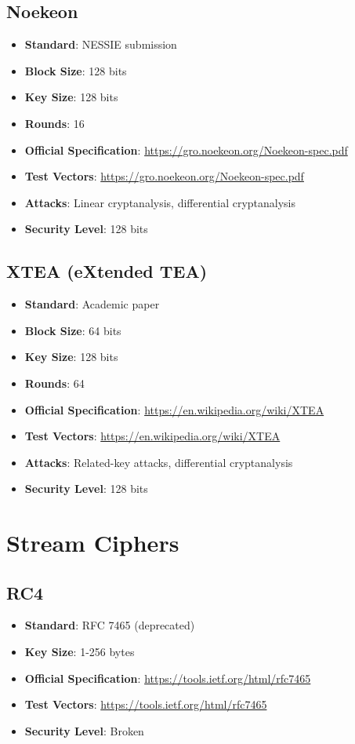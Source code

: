 \documentclass[11pt,a4paper]{article}
\begin{document}
\subsection{Noekeon}
\begin{itemize}
    \item \textbf{Standard}: NESSIE submission
    \item \textbf{Block Size}: 128 bits
    \item \textbf{Key Size}: 128 bits
    \item \textbf{Rounds}: 16
    \item \textbf{Official Specification}: \url{https://gro.noekeon.org/Noekeon-spec.pdf}
    \item \textbf{Test Vectors}: \url{https://gro.noekeon.org/Noekeon-spec.pdf}
    \item \textbf{Attacks}: Linear cryptanalysis, differential cryptanalysis
    \item \textbf{Security Level}: 128 bits
\end{itemize}

\subsection{XTEA (eXtended TEA)}
\begin{itemize}
    \item \textbf{Standard}: Academic paper
    \item \textbf{Block Size}: 64 bits
    \item \textbf{Key Size}: 128 bits
    \item \textbf{Rounds}: 64
    \item \textbf{Official Specification}: \url{https://en.wikipedia.org/wiki/XTEA}
    \item \textbf{Test Vectors}: \url{https://en.wikipedia.org/wiki/XTEA}
    \item \textbf{Attacks}: Related-key attacks, differential cryptanalysis
    \item \textbf{Security Level}: 128 bits
\end{itemize}

\section{Stream Ciphers}

\subsection{RC4}
\begin{itemize}
    \item \textbf{Standard}: RFC 7465 (deprecated)
    \item \textbf{Key Size}: 1-256 bytes
    \item \textbf{Official Specification}: \url{https://tools.ietf.org/html/rfc7465}
    \item \textbf{Test Vectors}: \url{https://tools.ietf.org/html/rfc7465}
    \item \textbf{Security Level}: Broken
\end{itemize}
\end{document}
